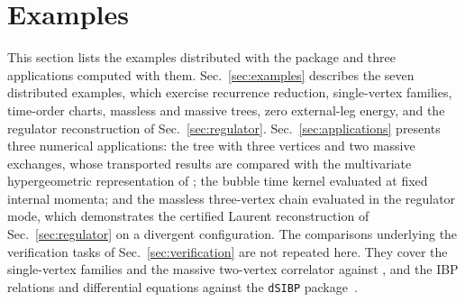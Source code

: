 \documentclass[11pt,a4paper]{article}
\numberwithin{table}{section}
\begin{document}
\section{Examples}
\label{sec:examples-section}

This section lists the examples distributed with the package and three applications computed
with them.
Sec.~\ref{sec:examples} describes the seven distributed examples, which exercise
recurrence reduction, single-vertex families, time-order charts, massless and massive trees,
zero external-leg energy, and the regulator reconstruction of Sec.~\ref{sec:regulator}.
Sec.~\ref{sec:applications} presents three numerical applications: the tree with three vertices and
two massive exchanges, whose transported results are compared with the multivariate hypergeometric
representation of \cite{Xianyu:2023ytd}; the bubble time kernel evaluated at fixed internal
momenta; and the massless three-vertex chain evaluated in the regulator mode, which demonstrates
the certified Laurent reconstruction of Sec.~\ref{sec:regulator} on a divergent configuration.
The comparisons underlying the verification tasks of Sec.~\ref{sec:verification} are not repeated
here. They cover the single-vertex families and the massive two-vertex correlator against
\cite{Chen:2024glu}, and the IBP relations and differential equations against the
\texttt{dSIBP} package~\cite{dSIBP:inPreparation}.
\end{document}
